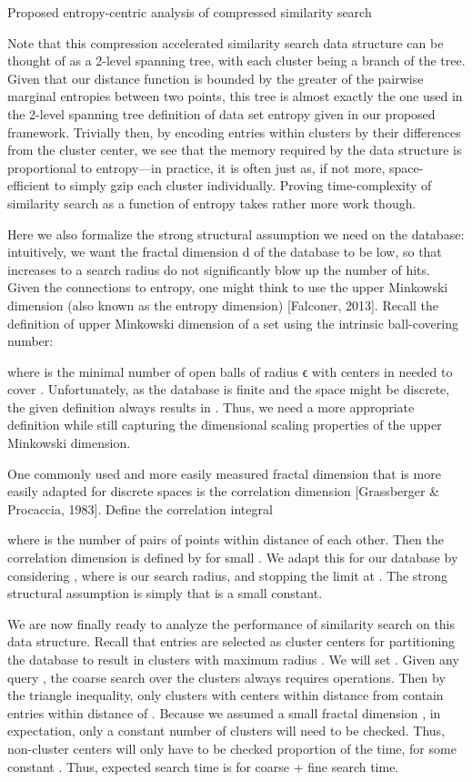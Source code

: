 \documentclass{amsbook}
\theoremstyle{definition}
\theoremstyle{remark}
\numberwithin{equation}{section}
\begin{document}
Proposed entropy-centric analysis of compressed similarity search

Note that this compression accelerated similarity search data structure can be thought of as a 2-level spanning tree, with each cluster being a branch of the tree.
Given that our distance function is bounded by the greater of the pairwise marginal entropies between two points, this tree is almost exactly the one used in the 2-level spanning tree definition of data set entropy given in our proposed framework.
Trivially then, by encoding entries within clusters by their differences from the cluster center, we see that the memory required by the data structure is proportional to entropy—in practice, it is often just as, if not more, space-efficient to simply gzip each cluster individually.
Proving time-complexity of similarity search as a function of entropy takes rather more work though.

Here we also formalize the strong structural assumption we need on the database: intuitively, we want the fractal dimension d of the database to be low, so that increases to a search radius do not significantly blow up the number of hits.
Given the connections to entropy, one might think to use the upper Minkowski dimension (also known as the entropy dimension) [Falconer, 2013].
Recall the definition of upper Minkowski dimension of a set  using the intrinsic ball-covering number:



where  is the minimal number of open balls of radius ϵ with centers in  needed to cover .
Unfortunately, as the database is finite and the space might be discrete, the given definition always results in .
Thus, we need a more appropriate definition while still capturing the dimensional scaling properties of the upper Minkowski dimension.

One commonly used and more easily measured fractal dimension that is more easily adapted for discrete spaces is the correlation dimension [Grassberger \& Procaccia, 1983].
Define the correlation integral



where  is the number of pairs of points within distance  of each other.
Then the correlation dimension  is defined by  for small .
We adapt this for our database by considering , where  is our search radius, and stopping the limit at .
The strong structural assumption is simply that  is a small constant.

We are now finally ready to analyze the performance of similarity search on this data structure.
Recall that  entries are selected as cluster centers for partitioning the database to result in clusters with maximum radius .
We will set  .
Given any query , the coarse search over the clusters always requires  operations.
Then by the triangle inequality, only clusters with centers within distance  from  contain entries within distance  of .
Because we assumed a small fractal dimension , in expectation, only a constant number of clusters will need to be checked.
Thus, non-cluster centers will only have to be checked  proportion of the time, for some constant .
Thus, expected search time is  for coarse + fine search time.
\end{document}
